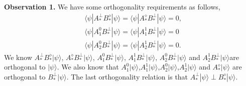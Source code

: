 \documentclass[11pt,letterpaper]{article}
\newcommand{\ket}[1]{|#1\rangle}
\newcommand{\bra}[1]{\langle#1|}
\newcommand{\1}{\mathbb{1}}
\theoremstyle{definition}
\begin{document}
\textbf{Observation 1.} We have some orthogonality requirements as follows,
\begin{align}
	&\bra{\psi}A_\ast^\perp B_\ast^\diamond \ket{\psi}= \bra{\psi}A_\ast^\diamond B_\ast^\perp \ket{\psi} = 0,\\
	&\bra{\psi}A_1^0 B_\ast^\perp \ket{\psi} = \bra{\psi}A_1^1 B_\ast^\perp \ket{\psi} = 0\\
	&\bra{\psi}A_2^0 B_\ast^\perp \ket{\psi} = \bra{\psi}A_2^1 B_\ast^\perp \ket{\psi} = 0.
\end{align}
We know $A_\ast^\perp B_\ast^\diamond \ket{\psi}$, $A_\ast^\diamond B_\ast^\perp \ket{\psi}$,  $A_1^0 B_\ast^\perp \ket{\psi}$,
$A_1^1 B_\ast^\perp \ket{\psi}$, $A_2^0 B_\ast^\perp \ket{\psi}$ and $A_2^1 B_\ast^\perp \ket{\psi}$are orthogonal to $\ket{\psi}$.
We also know that $A_1^0\ket{\psi}$,$A_1^1\ket{\psi}$,$A_2^0\ket{\psi}$,$A_2^1\ket{\psi}$ and $A_\ast^\diamond\ket{\psi}$ are
orthogonal to $B_\ast^\perp \ket{\psi}$. The last orthogonality relation is that $A_\ast^\perp\ket{\psi} \perp B_\ast^\diamond \ket{\psi}.$
\end{document}
